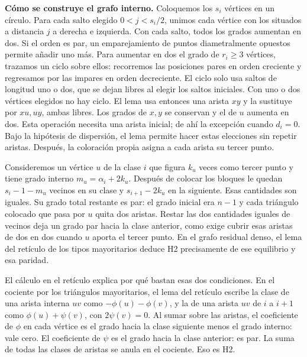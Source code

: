 \documentclass[spanish,11pt,a4paper]{article}
\begin{document}
\textbf{Cómo se construye el grafo interno.} Coloquemos los \(s_i\) vértices en un círculo. Para cada salto elegido \(0<j<s_i/2\), unimos cada vértice con los situados a distancia \(j\) a derecha e izquierda. Con cada salto, todos los grados aumentan en dos. Si el orden es par, un emparejamiento de puntos diametralmente opuestos permite añadir uno más. Para aumentar en dos el grado de \(r_i\ge3\) vértices, trazamos un ciclo sobre ellos: recorremos las posiciones pares en orden creciente y regresamos por las impares en orden decreciente. El ciclo solo usa saltos de longitud uno o dos, que se dejan libres al elegir los saltos iniciales. Con uno o dos vértices elegidos no hay ciclo. El lema usa entonces una arista \(xy\) y la sustituye por \(xu,uy\), ambas libres. Los grados de \(x,y\) se conservan y el de \(u\) aumenta en dos. Esta operación necesita una arista inicial; de ahí la excepción cuando \(d_i=0\). Bajo la hipótesis de dispersión, el lema permite hacer estas elecciones sin repetir aristas. Después, la coloración propia asigna a cada arista su tercer punto.

Consideremos un vértice \(u\) de la clase \(i\) que figura \(k_u\) veces como tercer punto y tiene grado interno \(m_u=\alpha_i+2k_u\). Después de colocar los bloques le quedan \(s_i-1-m_u\) vecinos en su clase y \(s_{i+1}-2k_u\) en la siguiente. Esas cantidades son iguales. Su grado total restante es par: el grado inicial era \(n-1\) y cada triángulo colocado que pasa por \(u\) quita dos aristas. Restar las dos cantidades iguales de vecinos deja un grado par hacia la clase anterior, como exige cubrir esas aristas de dos en dos cuando \(u\) aporta el tercer punto. En el grafo residual denso, el lema del retículo de los tipos mayoritarios deduce H2 precisamente de ese equilibrio y esa paridad.

El cálculo en el retículo explica por qué bastan esas dos condiciones. En el cociente por los triángulos mayoritarios, el lema del retículo escribe la clase de una arista interna \(uv\) como \(-\phi(u)-\phi(v)\), y la de una arista \(uv\) de \(i\) a \(i+1\) como \(\phi(u)+\psi(v)\), con \(2\psi(v)=0\). Al sumar sobre las aristas, el coeficiente de \(\phi\) en cada vértice es el grado hacia la clase siguiente menos el grado interno: vale cero. El coeficiente de \(\psi\) es el grado hacia la clase anterior: es par. La suma de todas las clases de aristas se anula en el cociente. Eso es H2.
\end{document}
